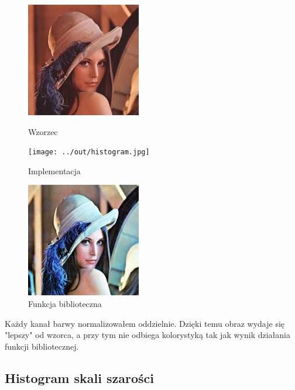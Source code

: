 \documentclass[a4paper,12pt]{article}
\begin{document}
\begin{figure}
\begin{minipage}[t]{5cm}
\begin{center}
\includegraphics[width=5cm,clip]{../../lena.jpg}
\caption{Wzorzec}
\end{center}
\end{minipage}
\hfill
\begin{minipage}[t]{5cm}
\begin{center}
\texttt{[image: ../out/histogram.jpg]}
\caption{Implementacja}
\end{center}
\end{minipage}
\hfill
\begin{minipage}[t]{5cm}
\begin{center}
\includegraphics[width=5cm,clip]{grafika/histogram_magick.jpg}
\caption{Funkcja biblioteczna}
\end{center}
\end{minipage}
\end{figure} 

Każdy kanał barwy normalizowałem oddzielnie. Dzięki temu obraz wydaje się "lepszy" od wzorca, a przy tym nie odbiega kolorystyką tak jak wynik działania funkcji bibliotecznej.




\newpage
\subsection{Histogram skali szarości}
\end{document}
